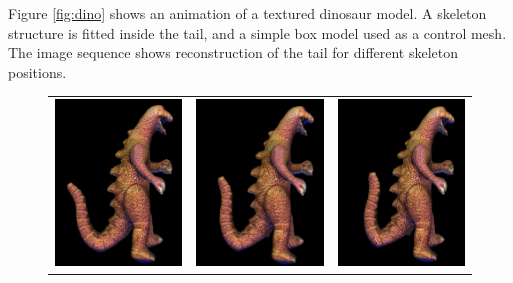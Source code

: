 \documentclass[10pt,oneside,fleqn,a4paper]{book}
\begin{document}
Figure \ref{fig:dino} shows an animation of a textured dinosaur model. A skeleton structure is fitted inside the tail, and a simple box model used as a control mesh. The image sequence shows reconstruction of the tail for different skeleton positions.

\begin{figure}
\begin{center}
\begin{tabular}{ccc}
\includegraphics[width=4.3cm]{../images/dino1} & \includegraphics[width=4.3cm]{../images/dino2} & \includegraphics[width=4.3cm]{../images/dino3} \\

\end{tabular}
\end{center}
\end{figure}
\end{document}
